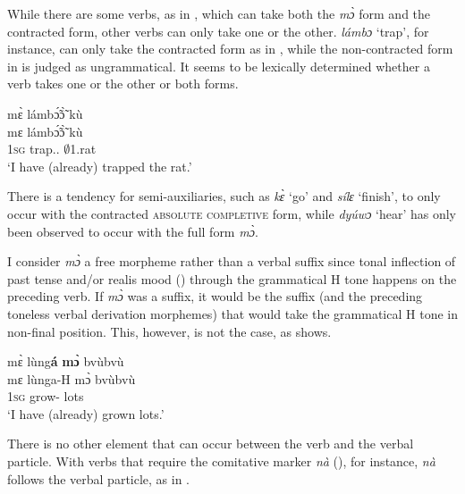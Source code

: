While there are some verbs, as in , which can take both the {\itshape mɔ̀} form and the contracted form, other verbs can only take one or the other. {\itshape lámbɔ} `trap', for instance, can only take the contracted form as in , while the non-contracted form in  is judged as ungrammatical. It seems to be lexically determined whether a verb takes one or the other or both forms.

\ea \label{absmo2}
\ea\label{absmo2a}
  \glll    mɛ̀ lámbɔ̃́ɔ̃̀ kù  \\
           mɛ lámbɔ̃́ɔ̃̀ kù  \\
             1\textsc{sg}  trap.{\R}.{\COMPL} $\emptyset$1.rat  \\
    \trans `I have (already) trapped the rat.'
\z
\z

\noindent There is a tendency for semi-auxiliaries, such as {\itshape kɛ̀} `go' and {\itshape sílɛ} `finish', to only occur with  the contracted \textsc{absolute completive} form, while {\itshape dyúwɔ} `hear' has only been observed to occur with the full form {\itshape mɔ̀}.

I consider {\itshape mɔ̀} a free morpheme rather than a verbal suffix since  tonal inflection of past tense and/or realis mood () through the grammatical H tone happens on the preceding verb. If {\itshape mɔ̀} was a suffix, it would be the suffix (and the preceding toneless verbal derivation morphemes) that would take the grammatical H tone in non-final position. This, however, is not the case, as  shows.

\ea \label{absmo1c}
  \glll    mɛ̀ lùng{\bfseries á} {\bfseries mɔ̀} bvùbvù\\
           mɛ lùnga-H mɔ̀  bvùbvù \\
             1\textsc{sg}  grow-{\R} {\COMPL}  lots \\
    \trans `I have (already) grown lots.'
\z

There is no other element that can occur between the verb and the verbal particle.  With verbs that require the comitative marker {\itshape nà} (), for instance, {\itshape nà} follows the verbal particle, as in .

